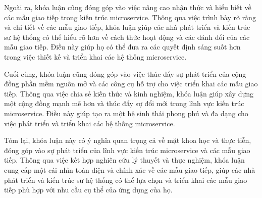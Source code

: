 Ngoài ra, khóa luận cũng đóng góp vào việc nâng cao nhận thức và hiểu biết về các mẫu giao tiếp trong kiến trúc microservice. Thông qua việc trình bày rõ ràng và chi tiết về các mẫu giao tiếp, khóa luận giúp các nhà phát triển và kiến trúc sư hệ thống có thể hiểu rõ hơn về cách thức hoạt động và các đánh đổi của các mẫu giao tiếp. Điều này giúp họ có thể đưa ra các quyết định sáng suốt hơn trong việc thiết kế và triển khai các hệ thống microservice.

Cuối cùng, khóa luận cũng đóng góp vào việc thúc đẩy sự phát triển của cộng đồng phần mềm nguồn mở và các công cụ hỗ trợ cho việc triển khai các mẫu giao tiếp. Thông qua việc chia sẻ kiến thức và kinh nghiệm, khóa luận giúp xây dựng một cộng đồng mạnh mẽ hơn và thúc đẩy sự đổi mới trong lĩnh vực kiến trúc microservice. Điều này giúp tạo ra một hệ sinh thái phong phú và đa dạng cho việc phát triển và triển khai các hệ thống microservice.

Tóm lại, khóa luận này có ý nghĩa quan trọng cả về mặt khoa học và thực tiễn, đóng góp vào sự phát triển của lĩnh vực kiến trúc microservice và các mẫu giao tiếp. Thông qua việc kết hợp nghiên cứu lý thuyết và thực nghiệm, khóa luận cung cấp một cái nhìn toàn diện và chính xác về các mẫu giao tiếp, giúp các nhà phát triển và kiến trúc sư hệ thống có thể lựa chọn và triển khai các mẫu giao tiếp phù hợp với nhu cầu cụ thể của ứng dụng của họ. 